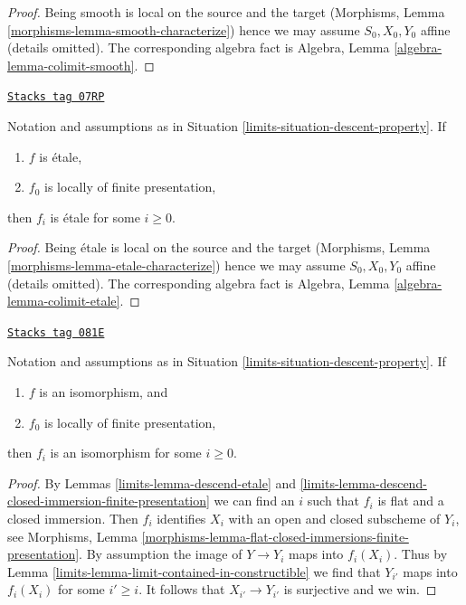 \begin{proof}
Being smooth is local on the source and the target (Morphisms,
Lemma \ref{morphisms-lemma-smooth-characterize}) hence we may assume
$S_0, X_0, Y_0$ affine (details omitted). The corresponding algebra fact is
Algebra, Lemma \ref{algebra-lemma-colimit-smooth}.
\end{proof}

\begin{lemma}
\label{limits-lemma-descend-etale}
\href{https://stacks.math.columbia.edu/tag/07RP}{\texttt{Stacks tag 07RP}}

Notation and assumptions as in Situation \ref{limits-situation-descent-property}.
If
\begin{enumerate}
\item $f$ is \'etale,
\item $f_0$ is locally of finite presentation,
\end{enumerate}
then $f_i$ is \'etale for some $i \geq 0$.
\end{lemma}

\begin{proof}
Being \'etale is local on the source and the target (Morphisms,
Lemma \ref{morphisms-lemma-etale-characterize}) hence we may assume
$S_0, X_0, Y_0$ affine (details omitted). The corresponding algebra fact is
Algebra, Lemma \ref{algebra-lemma-colimit-etale}.
\end{proof}

\begin{lemma}
\label{limits-lemma-descend-isomorphism}
\href{https://stacks.math.columbia.edu/tag/081E}{\texttt{Stacks tag 081E}}

Notation and assumptions as in Situation \ref{limits-situation-descent-property}.
If
\begin{enumerate}
\item $f$ is an isomorphism, and
\item $f_0$ is locally of finite presentation,
\end{enumerate}
then $f_i$ is an isomorphism for some $i \geq 0$.
\end{lemma}

\begin{proof}

By Lemmas \ref{limits-lemma-descend-etale} and
\ref{limits-lemma-descend-closed-immersion-finite-presentation}
we can find an $i$ such that $f_i$ is flat and a closed immersion.
Then $f_i$ identifies $X_i$ with an open and closed subscheme of
$Y_i$, see Morphisms, Lemma
\ref{morphisms-lemma-flat-closed-immersions-finite-presentation}.
By assumption the image of $Y \to Y_i$ maps into $f_i(X_i)$.
Thus by Lemma \ref{limits-lemma-limit-contained-in-constructible}
we find that $Y_{i'}$ maps into $f_i(X_i)$ for some $i' \geq i$.
It follows that $X_{i'} \to Y_{i'}$ is surjective and we win.
\end{proof}

